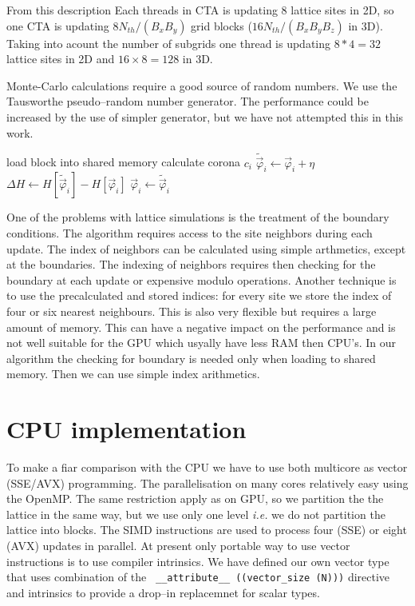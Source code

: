 \documentclass[a4paper]{llncs}
\newcommand{\vphi}{\vec{\varphi}}
\begin{document}
From this description Each threads in CTA is updating 8
lattice sites in 2D, so one CTA is updating $8 N_{th}/(B_x B_y)$ grid
blocks ($16 N_{th}/(B_x B_y B_z)$ in 3D). Taking into acount the number of
subgrids one thread is updating $8*4=32$ lattice sites in 2D and
$16\times 8=128$ in 3D.

Monte-Carlo calculations require a good source of random numbers. We
use the Tausworthe pseudo--random number
generator\cite{howes_thomas07}. The performance could be increased by
the use of simpler generator, but we have not attempted this in this
work.

\begin{algorithm}
\begin{algorithmic}[1]
\State load block  into shared memory
\State calculate corona $c_i$ 
\State $\widetilde{\vphi}_i \gets \vphi_i+\eta$
\State $\Delta H \gets H[\widetilde{\vphi}_i]-H[\vphi_i]$
\State $\vphi_i \gets \widetilde{\vphi}_i$
\EndIf
\EndFor
\EndFor 
{}
\EndFor
\EndFor
\EndFor
\EndFor
\end{algorithmic}
\caption{\label{alg:gpu}}
\end{algorithm}


One of the problems with lattice simulations is the treatment of the
boundary conditions. The algorithm requires access to the site
neighbors during each update. The index of neighbors can be calculated
using simple arthmetics, except at the boundaries. The indexing of
neighbors requires then checking for the boundary at each update or
expensive modulo operations. Another technique is to use the
precalculated and stored indices: for every site we store the index of
four or six nearest neighbours. This is also very flexible but
requires a large amount of memory. This can have a negative impact on
the performance and is not well suitable for the GPU which usyally
have less RAM then CPU's. In our algorithm the checking for boundary
is needed only when loading to shared memory. Then we can use simple
index arithmetics.




\section{CPU implementation}
To make a fiar comparison with the CPU we have to use both multicore
as vector (SSE/AVX) programming.  The parallelisation on many cores
relatively easy using the OpenMP. The same restriction apply as on
GPU, so we partition the the lattice in the same way, but we use only
one level {\em i.e.} we do not partition the lattice into blocks.  The
SIMD instructions are used to process four (SSE) or eight (AVX)
updates in parallel.  At present only portable way to use vector
instructions is to use compiler intrinsics\cite{intr}. We have defined
our own vector type that uses combination of the 
 \lstinline! __attribute__ ((vector_size (N)))!  directive and intrinsics
to provide a drop--in replacemnet for scalar types.
\end{document}

